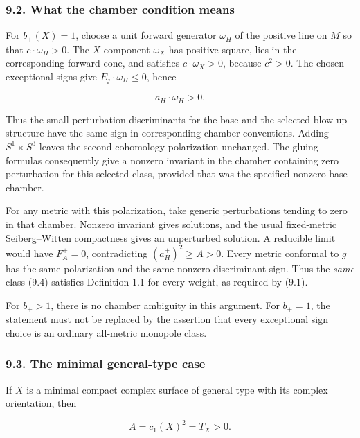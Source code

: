 \documentclass[
  10pt,
]{article}
\begin{document}
\hypertarget{what-the-chamber-condition-means}{%
\subsubsection{9.2. What the chamber condition
means}\label{what-the-chamber-condition-means}}

For \(b_+(X)=1\), choose a unit forward generator \(\omega_H\) of the
positive line on \(M\) so that \(c\cdot\omega_H>0\). The \(X\) component
\(\omega_X\) has positive square, lies in the corresponding forward
cone, and satisfies \(c\cdot\omega_X>0\), because \(c^2>0\). The chosen
exceptional signs give \(E_j\cdot\omega_H\le0\), hence

\[
                          a_H\cdot\omega_H>0.             \tag{9.7}
\]

Thus the small-perturbation discriminants for the base and the selected
blow-up structure have the same sign in corresponding chamber
conventions. Adding \(S^1\times S^3\) leaves the second-cohomology
polarization unchanged. The gluing formulas consequently give a nonzero
invariant in the chamber containing zero perturbation for this selected
class, provided that was the specified nonzero base chamber.

For any metric with this polarization, take generic perturbations
tending to zero in that chamber. Nonzero invariant gives solutions, and
the usual fixed-metric Seiberg--Witten compactness gives an unperturbed
solution. A reducible limit would have \(F_A^+=0\), contradicting
\((a_H^+)^2\ge A>0\). Every metric conformal to \(g\) has the same
polarization and the same nonzero discriminant sign. Thus the
\emph{same} class (9.4) satisfies Definition 1.1 for every weight, as
required by (9.1).

For \(b_+>1\), there is no chamber ambiguity in this argument. For
\(b_+=1\), the statement must not be replaced by the assertion that
every exceptional sign choice is an ordinary all-metric monopole class.

\hypertarget{the-minimal-general-type-case}{%
\subsubsection{9.3. The minimal general-type
case}\label{the-minimal-general-type-case}}

If \(X\) is a minimal compact complex surface of general type with its
complex orientation, then

\[
                          A=c_1(X)^2=T_X>0.
\]
\end{document}
